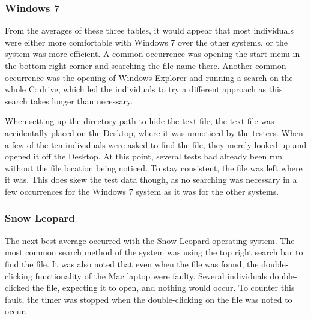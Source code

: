 \documentclass[11pt,letterpaper]{report}
\begin{document}
\subsubsection{Windows 7}
From the averages of these three tables, it would appear that most individuals were either more comfortable with Windows 7 over the other systems, or the system was more efficient. A common occurrence was opening the start menu in the bottom right corner and searching the file name there. Another common occurrence was the opening of Windows Explorer and running a search on the whole C: drive, which led the individuals to try a different approach as this search takes longer than necessary.

When setting up the directory path to hide the text file, the text file was accidentally placed on the Desktop, where it was unnoticed by the testers. When a few of the ten individuals were asked to find the file, they merely looked up and opened it off the Desktop. At this point, several tests had already been run without the file location being noticed. To stay consistent, the file was left where it was. This does skew the test data though, as no searching was necessary in a few occurrences for the Windows 7 system as it was for the other systems.

\subsubsection{Snow Leopard}
The next best average occurred with the Snow Leopard operating system. The most common search method of the system was using the top right search bar to find the file. It was also noted that even when the file was found, the double-clicking functionality of the Mac laptop were faulty. Several individuals double-clicked the file, expecting it to open, and nothing would occur. To counter this fault, the timer was stopped when the double-clicking on the file was noted to occur.
\end{document}
